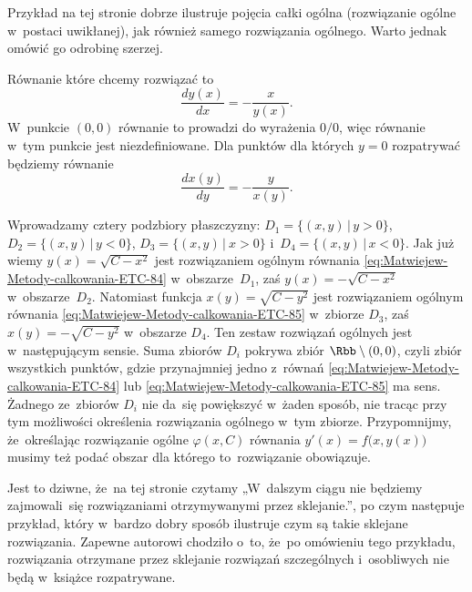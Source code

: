 \documentclass[a4paper,11pt]{article}
\numberwithin{equation}{section}
\begin{document}
\VerSpaceFour





\noindent
{} Przykład na tej stronie dobrze ilustruje pojęcia całki ogólna
(rozwiązanie ogólne w~postaci uwikłanej), jak również samego rozwiązania
ogólnego. Warto jednak omówić go odrobinę szerzej.

Równanie które chcemy rozwiązać to
\begin{equation}
  \label{eq:Matwiejew-Metody-calkowania-ETC-84}
  \frac{ d y( x ) }{ dx } = -\frac{ x }{ y( x ) }.
\end{equation}
W~punkcie $( 0, 0 )$ równanie to prowadzi do wyrażenia $0 / 0$, więc
równanie w~tym punkcie jest niezdefiniowane. Dla punktów dla których
$y = 0$ rozpatrywać będziemy równanie
\begin{equation}
  \label{eq:Uwagi-do-konkrentych-stron-65}
  \frac{ d x( y ) }{ dy } = -\frac{ y }{ x( y ) }.
\end{equation}

Wprowadzamy cztery podzbiory płaszczyzny:
$D_{ 1 } = \{ ( x, y ) \, | \, y > 0 \}$,
$D_{ 2 } = \{ ( x, y ) \, | \, y < 0 \}$,
$D_{ 3 } = \{ ( x, y ) \, | \ x > 0 \}$
i~$D_{ 4 } = \{ ( x, y ) \, | \, x < 0 \}$. Jak już wiemy
$y( x ) = \sqrt{ C - x^{ 2 } }$ jest rozwiązaniem ogólnym równania
\eqref{eq:Matwiejew-Metody-calkowania-ETC-84} w~obszarze~$D_{ 1 }$, zaś
$y( x ) = -\sqrt{ C - x^{ 2 } }$ w~obszarze~$D_{ 2 }$. Natomiast funkcja
$x( y ) = \sqrt{ C - y^{ 2 } }$ jest rozwiązaniem ogólnym równania
\eqref{eq:Matwiejew-Metody-calkowania-ETC-85} w~zbiorze $D_{ 3 }$, zaś
$x( y ) = -\sqrt{ C - y^{ 2 } }$ w~obszarze $D_{ 4 }$. Ten zestaw rozwiązań
ogólnych jest w~następującym sensie. Suma zbiorów $D_{ i }$ pokrywa zbiór
$\Rbb \setminus { ( 0, 0 ) }$, czyli zbiór wszystkich punktów, gdzie przynajmniej
jedno z~równań \eqref{eq:Matwiejew-Metody-calkowania-ETC-84} lub
\eqref{eq:Matwiejew-Metody-calkowania-ETC-85} ma sens. Żadnego ze~zbiorów
$D_{ i }$ nie da~się powiększyć w~żaden sposób, nie tracąc przy tym
możliwości określenia rozwiązania ogólnego w~tym zbiorze. Przypomnijmy,
że~określając rozwiązanie ogólne $\varphi( x, C )$ równania
$y'( x ) = f\big( x, y( x ) \big)$ musimy też podać obszar dla którego
to~rozwiązanie obowiązuje.

\VerSpaceFour





\noindent
{} Jest to dziwne, że~na tej stronie czytamy „W~dalszym ciągu nie
będziemy zajmowali~się rozwiązaniami otrzymywanymi przez sklejanie.”, po
czym następuje przykład, który w~bardzo dobry sposób ilustruje czym są
takie sklejane rozwiązania. Zapewne autorowi chodziło o~to, że~po omówieniu
tego przykładu, rozwiązania otrzymane przez sklejanie rozwiązań szczególnych
i~osobliwych nie będą w~książce rozpatrywane.
\end{document}
